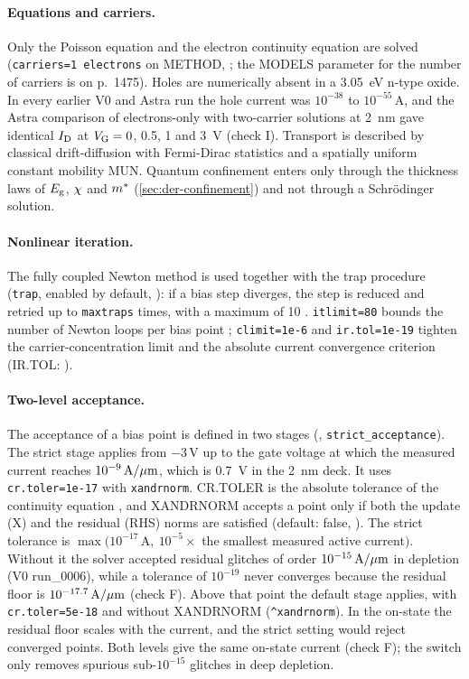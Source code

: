 \paragraph{Equations and carriers.} Only the Poisson equation and the electron continuity equation are solved
(\texttt{carriers=1 electrons} on METHOD, \citep[p.~1386]{AtlasManual}; the MODELS parameter for the number of
carriers is on p.~1475). Holes are numerically absent in a \SI{3.05}{eV} n-type oxide. In every earlier V0 and Astra run
the hole current was $10^{-38}$ to $10^{-55}$\,A, and the Astra comparison of electrons-only with two-carrier solutions
at \SI{2}{nm} gave identical $I_{\mathrm{D}}$ at $V_{\mathrm{G}} = 0$, 0.5, 1 and \SI{3}{V} (check I). Transport is described by classical
drift-diffusion with Fermi-Dirac statistics and a spatially uniform constant mobility MUN. Quantum confinement enters
only through the thickness laws of $E_{\mathrm{g}}$, $\chi$ and $m^{*}$ (\cref{sec:der-confinement}) and not through a
Schr\"odinger solution.

\paragraph{Nonlinear iteration.} The fully coupled Newton method is used together with the trap procedure (\texttt{trap},
enabled by default, \citep[p.~1383]{AtlasManual}): if a bias step diverges, the step is reduced and retried up to
\texttt{maxtraps} times, with a maximum of 10 \citep[pp.~1389, 1395]{AtlasManual}. \texttt{itlimit=80} bounds the
number of Newton loops per bias point \citep[p.~1389]{AtlasManual}; \texttt{climit=1e-6} and \texttt{ir.tol=1e-19}
tighten the carrier-concentration limit and the absolute current convergence criterion (IR.TOL:
\citep[p.~1386]{AtlasManual}).

\paragraph{Two-level acceptance.} The acceptance of a bias point is defined in two stages (,
\texttt{strict\_acceptance}). The strict stage applies from $-3$\,V up to the gate voltage at which the measured current
reaches $10^{-9}\,\mathrm{A}/\mu\mathrm{m}$, which is \SI{0.7}{V} in the \SI{2}{nm} deck. It uses \texttt{cr.toler=1e-17} with
\texttt{xandrnorm}. CR.TOLER is the absolute tolerance of the continuity equation \citep[p.~1386]{AtlasManual}, and
XANDRNORM accepts a point only if both the update (X) and the residual (RHS) norms are satisfied
\citep[p.~1387]{AtlasManual} (default: false, \citep[p.~1383]{AtlasManual}). The strict tolerance is
$\max(10^{-17}\,\mathrm{A},\ 10^{-5}\times$ the smallest measured active current$)$. Without it the solver accepted
residual glitches of order $10^{-15}\,\mathrm{A}/\mu\mathrm{m}$ in depletion (V0 run\_0006), while a tolerance of $10^{-19}$ never converges
because the residual floor is $10^{-17.7}\,\mathrm{A}/\mu\mathrm{m}$ (check F). Above that point the default stage applies, with
\texttt{cr.toler=5e-18} and without XANDRNORM (\verb|^xandrnorm|). In the on-state the residual floor scales with the
current, and the strict setting would reject converged points. Both levels give the same on-state current (check F); the
switch only removes spurious sub-$10^{-15}$ glitches in deep depletion.

